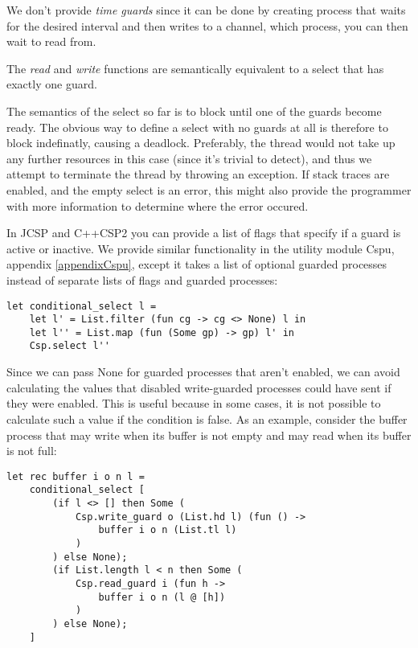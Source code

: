 \documentclass[a4paper,12pt]{article}
\begin{document}
We don't provide {\it time guards} since it can be done by creating process
that waits for the desired interval and then writes to a channel, which
process, you can then wait to read from.

The \emph{read} and \emph{write} functions are semantically equivalent to a 
select that has exactly one guard.

The semantics of the select so far is to block until one of the guards become
ready. The obvious
way to define a select with no guards at all is therefore to block indefinatly,
causing a deadlock.
Preferably, the thread would not take up any further resources in this case (since it's trivial to 
detect), and thus we attempt to terminate the thread by throwing an exception. If stack traces are
enabled, and the empty select is an error, this might also provide the programmer with more information
to determine where the error occured.

In JCSP and C++CSP2 you can provide a list of flags that specify if a guard is
active or inactive. We provide similar functionality in the utility module Cspu,
appendix \ref{appendixCspu}, except it takes a list of optional guarded
processes instead of separate lists of flags and guarded processes:

\goodbreak
\begin{verbatim}
let conditional_select l =
    let l' = List.filter (fun cg -> cg <> None) l in
    let l'' = List.map (fun (Some gp) -> gp) l' in
    Csp.select l''
\end{verbatim}

Since we can pass None for guarded processes that aren't enabled, we can avoid
calculating the values that disabled write-guarded processes could have sent if
they were enabled. This is useful because in some cases, it is not possible to
calculate such a value if the condition is false. As an example, consider the
buffer process that may write when its buffer is not empty and may read when its
buffer is not full:

\goodbreak
\begin{verbatim}
let rec buffer i o n l =
    conditional_select [
        (if l <> [] then Some (
            Csp.write_guard o (List.hd l) (fun () -> 
                buffer i o n (List.tl l)
            )
        ) else None);
        (if List.length l < n then Some (
            Csp.read_guard i (fun h -> 
                buffer i o n (l @ [h])
            )
        ) else None);
    ]
\end{verbatim}
\end{document}

